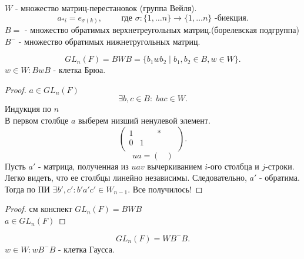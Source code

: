 \documentclass[11pt]{book}
\theoremstyle{definition}
\theoremstyle{plain}
\theoremstyle{plain}
\theoremstyle{definition}
\theoremstyle{remark}
\begin{document}
\begin{defn}
    $W$ - множество матриц-перестановок (группа Вейля).
    \[
	a_{*i} = e_{\sigma(k)}, \qquad \mbox{ где } \sigma : \{1, \ldots n \} \to \{1, \ldots n\} \mbox{ -биекция}
    .\] 
    $B = $
    - множество обратимых верхнетреугольных матриц.(борелевская подгруппа)
    $B^{-}$ - множество обратимых нижнетругольных матриц.
\end{defn}
\begin{thm}
\[
    GL_n(F) = BWB = \{b_1 w b_2 \mid b_1, b_2 \in B, w \in W\}
.\] 
$ w  \in W: B w B$ - клетка Брюа.
\end{thm}
\begin{proof}
    $a \in GL_n (F)$ 
    \[
    \exists b, c \in B: \; bac \in W
    .\] 
    Индукция по $n$\\
    В первом столбце $a$ выберем низший ненулевой элемент.%
    \[
    \left ( 
    \begin{array}{cccccc}
    1 &&& * && \\
    0 &1&&  && \\
    \end{array}
    \right )
    .\] 
    $$
    ua = \left ( 
    \begin{array}{ccc}
    
    \end{array}
    \right )
    $$
    Пусть $a'$ - матрица, полученная из $ uav$ вычеркиванием $i$-ого столбца и $j$-строки. Легко видеть, что ее столбцы линейно независимы. Следовательно, $a'$ - обратима. Тогда по ПИ $\exists b', c' : b' a' c' \in W_{n-1}$. Все получилось!

\end{proof}
\begin{proof}
    см конспект
    $GL_n (F) = BWB$ \\
    $a \in  GL_n(F)$
\end{proof}
\begin{thm}
    \[
	GL_n(F) = W B^{-} B
    .\] 
    $w \in W: w B^{-} B $ - клетка Гаусса.
\end{thm}
\end{document}
